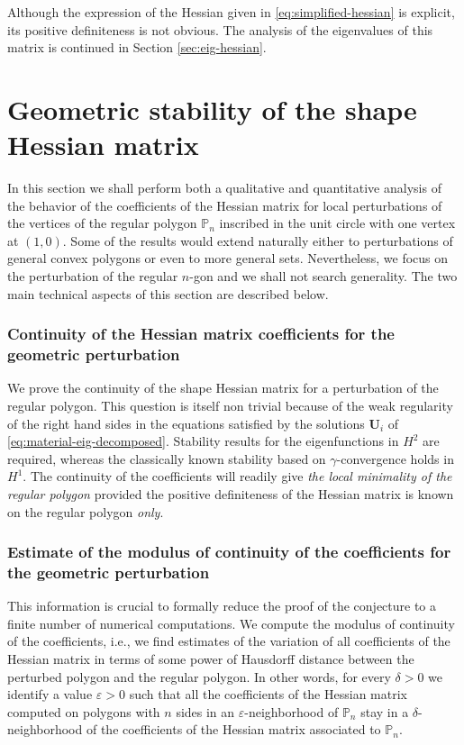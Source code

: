 \documentclass[11pt]{article}
\newcommand{\ie}{i.e.,\xspace}
\newcommand{\Subsubsection}{\subsubsection}
\numberwithin{equation}{section}\newtheorem*{jepEnonce}{\jepEnonceTitle}\newenvironment{enonce*}[1]{\def\jepEnonceTitle{#1}\jepEnonce}{\endjepEnonce}\newtheorem*{conj*}{Conjecture}
\theoremstyle{plain}
\theoremstyle{definition}
\newcommand{\bo}[1]{{\boldsymbol#1}}
\newcommand{\vps}{\varepsilon}
\begin{document}
Although the expression of the Hessian given in \eqref{eq:simplified-hessian} is explicit, its positive definiteness is not obvious. The analysis of the eigenvalues of this matrix is continued in Section \ref{sec:eig-hessian}.

\section{Geometric stability of the shape Hessian matrix}\label{bobus3}
In this section we shall perform both a qualitative and quantitative analysis of the behavior of the coefficients of the Hessian matrix for local perturbations of the vertices of the regular polygon $\mathbb P_n$ inscribed in the unit circle with one vertex at $(1,0)$. Some of the results would extend naturally either to perturbations of general convex polygons or even to more general sets. Nevertheless, we focus on the perturbation of the regular $n$-gon and we shall not search generality. The two main technical aspects of this section are described below.

\subsubsection*{Continuity of the Hessian matrix coefficients for the geometric perturbation}
We prove the continuity of the shape Hessian matrix for a perturbation of the regular polygon. This question is itself non trivial because of the weak regularity of the right hand sides in the equations satisfied by the solutions $\bo U_i$ of \eqref{eq:material-eig-decomposed}. Stability results for the eigenfunctions in $H^2$ are required, whereas the classically known stability based on $\gamma$-convergence holds in $H^1$. The continuity of the coefficients will readily give {\it the local minimality of the regular polygon} provided the positive definiteness of the Hessian matrix is known on the regular polygon {\it only}.

\Subsubsection*{Estimate of the modulus of continuity of the coefficients for the geometric perturbation}
This information is crucial to formally reduce the proof of the conjecture to a finite number of numerical computations. We compute the modulus of continuity of the coefficients, \ie we find estimates of the variation of all coefficients of the Hessian matrix in terms of some power of Hausdorff distance between the perturbed polygon and the regular polygon. In other words, for every $\delta >0$ we identify a value $\vps >0$ such that all the coefficients of the Hessian matrix computed on polygons with $n$ sides in an $\vps$-neighborhood of $\mathbb P_n$ stay in a $\delta$-neighborhood of the coefficients of the Hessian matrix associated to $\mathbb P_n$.
\end{document}
